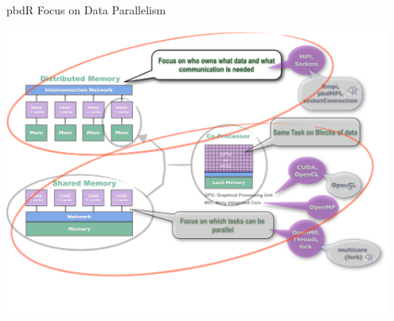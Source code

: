 \begin{frame}
\begin{block}{pbdR Focus on Data Parallelism}
    
\includegraphics[width=0.95\textwidth]{../common/pics/ParallelHardware11.pdf}
\end{block}
\end{frame}